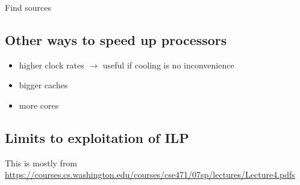\documentclass[12pt,a4paper]{article}
\begin{document}
Find sources

\subsection{Other ways to speed up processors}
\begin{itemize}
	\item higher clock rates $\rightarrow$ useful if cooling is no inconvenience
	\item bigger caches
	\item more cores
\end{itemize}

\subsection{Limits to exploitation of ILP}

This is mostly from \url{https://courses.cs.washington.edu/courses/cse471/07sp/lectures/Lecture4.pdfs}
\end{document}
